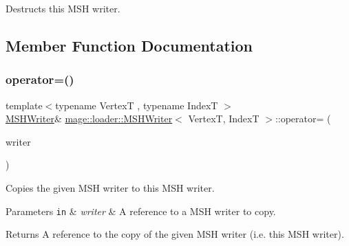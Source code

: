 Destructs this M\+SH writer. 

\subsection{Member Function Documentation}
\hypertarget{classmage_1_1loader_1_1_m_s_h_writer_a27976d47d2ef19b8a1e1d3e79347439a}{}\label{classmage_1_1loader_1_1_m_s_h_writer_a27976d47d2ef19b8a1e1d3e79347439a} 
\subsubsection{\texorpdfstring{operator=()}{operator=()}\hspace{0.1cm}{\footnotesize\ttfamily [1/2]}}
{\footnotesize\ttfamily template$<$typename VertexT , typename IndexT $>$ \\
\hyperlink{classmage_1_1loader_1_1_m_s_h_writer}{M\+S\+H\+Writer}\& \hyperlink{classmage_1_1loader_1_1_m_s_h_writer}{mage\+::loader\+::\+M\+S\+H\+Writer}$<$ VertexT, IndexT $>$\+::operator= (\begin{DoxyParamCaption}\item[{const \hyperlink{classmage_1_1loader_1_1_m_s_h_writer}{M\+S\+H\+Writer}$<$ VertexT, IndexT $>$ \&}]{writer }\end{DoxyParamCaption})\hspace{0.3cm}{\ttfamily [delete]}}

Copies the given M\+SH writer to this M\+SH writer.


\begin{DoxyParams}[1]{Parameters}
\mbox{\tt in}  & {\em writer} & A reference to a M\+SH writer to copy. \\
\hline
\end{DoxyParams}
\begin{DoxyReturn}{Returns}
A reference to the copy of the given M\+SH writer (i.\+e. this M\+SH writer). 
\end{DoxyReturn}
\hypertarget{classmage_1_1loader_1_1_m_s_h_writer_ac470e8a781db03c6d3138393a66518f4}{}\label{classmage_1_1loader_1_1_m_s_h_writer_ac470e8a781db03c6d3138393a66518f4} 
